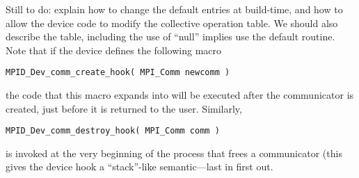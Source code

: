 Still to do: explain how to change the default entries at build-time,
and how to allow the device code to modify the collective operation
table.  We should also describe the table, including the use of
``null'' implies use the default routine.  
Note that if the device defines the following macro
\begin{verbatim}
MPID_Dev_comm_create_hook( MPI_Comm newcomm )
\end{verbatim}
the code that this macro expands into will be executed after the
communicator is created, just before it is returned to the user.
Similarly,
\begin{verbatim}
MPID_Dev_comm_destroy_hook( MPI_Comm comm )
\end{verbatim}
is invoked at the very beginning of the process that frees a
communicator (this gives the device hook a ``stack''-like
semantic---last in first out.

